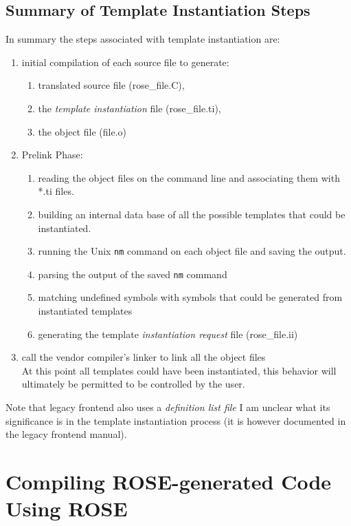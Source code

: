 {\subsection{Summary of Template Instantiation Steps}
   In summary the steps associated with template instantiation are:
\begin{enumerate}
   \item initial compilation of each source file to generate: 
   \begin{enumerate}
      \item translated source file (rose\_file.C),
      \item the {\em template instantiation} file (rose\_file.ti),
      \item the object file (file.o)
   \end{enumerate}
   \item Prelink Phase:
   \begin{enumerate}
      \item reading the object files on the command line and associating them with *.ti files.  
      \item building an internal data base of all the possible templates that could be instantiated.
      \item running the Unix {\tt nm} command on each object file and saving the output.
      \item parsing the output of the saved {\tt nm} command
      \item matching undefined symbols with symbols that could be generated from instantiated templates
      \item generating the template {\em instantiation request} file (rose\_file.ii)
   \end{enumerate}
   \item call the vendor compiler's linker to link all the object files \\
         At this point all templates could have been instantiated, this behavior will
         ultimately be permitted to be controlled by the user.
\end{enumerate}

Note that legacy frontend also uses a {\em definition list file}  I am unclear what its significance
is in the template instantiation process (it is however documented in the legacy frontend manual).
}


\section{Compiling ROSE-generated Code Using ROSE}

